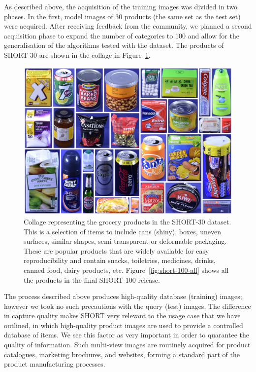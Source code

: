 As described above, the acquisition of the training images was divided in two phases. In the first, model images of 30 products (the same set as the test set) were acquired. After receiving feedback from the community, we planned a second acquisition phase to expand the number of categories to 100 and allow for the generalisation of the algorithms tested with the dataset. The products of SHORT-30 are shown in the collage in Figure~\ref{fig:collage-all}.

\begin{figure}[]
\centering
\includegraphics[width=\textwidth]{./gfx/Chapter03/icip-all-products.jpg}
\caption{Collage representing the grocery products in the SHORT-30 dataset. This is a selection of items to include cans (shiny), boxes, uneven surfaces, similar shapes, semi-transparent or deformable packaging. These are popular products that are widely available for easy reproducibility and contain snacks, toiletries, medicines, drinks, canned food, dairy products, etc. Figure~\ref{fig:short-100-all} shows all the products in the final SHORT-100 release.}
\label{fig:collage-all}
\end{figure}


The process described above produces high-quality database (training) images; however we took no such precautions with the query (test) images. The difference in capture quality makes SHORT very relevant to the usage case that we have outlined, in which high-quality product images are used to provide a controlled database of items.  We see this factor as very important in order to quarantee the quality of information.  Such multi-view images are routinely acquired for product catalogues, marketing brochures, and websites, forming a standard part of the product manufacturing processes.

